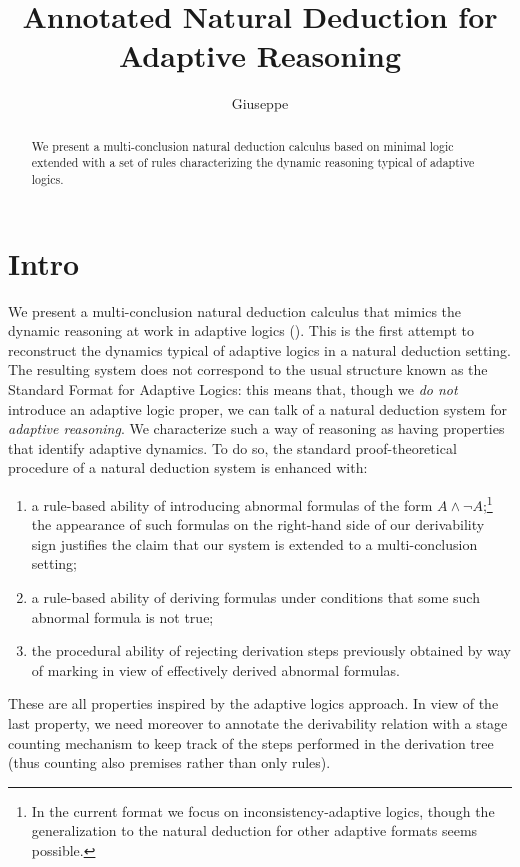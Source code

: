 \documentclass[]{article}
\title{Annotated Natural Deduction for Adaptive Reasoning}
\author{Giuseppe	}
\begin{document}
\maketitle

\begin{abstract}
We present a multi-conclusion natural deduction calculus based on minimal logic extended with a set of rules characterizing the dynamic reasoning typical of adaptive logics.
\end{abstract}

\section{Intro}

We present a multi-conclusion natural deduction calculus that mimics the dynamic reasoning at work in adaptive logics (\cite{batens07}). This is the first attempt to reconstruct the dynamics typical of adaptive logics in a natural deduction setting. The resulting system does not correspond to the usual structure known as the Standard Format for Adaptive Logics: this means that, though we \textit{do not} introduce an adaptive logic proper, we can talk of a natural deduction system for \textit{adaptive reasoning}. We characterize such a way of reasoning as having properties that identify adaptive dynamics.  To do so, the standard proof-theoretical procedure of a natural deduction system is enhanced with:

\begin{enumerate}
\item a rule-based ability of introducing abnormal formulas of the form $A\wedge \neg A$;\footnote{In the current format we focus on inconsistency-adaptive logics, though the generalization to the natural deduction for other adaptive formats seems possible.} the appearance of such formulas on the right-hand side of our derivability sign justifies the claim that our system is extended to a multi-conclusion setting;

\item a rule-based ability of deriving formulas under conditions that some such abnormal formula is not true;

\item the procedural ability of rejecting derivation steps previously obtained by way of marking in view of effectively derived abnormal formulas.
\end{enumerate}

These are all properties inspired by the adaptive logics approach. In view of the last property, we need moreover to annotate the derivability relation with a stage counting mechanism to keep track of the steps performed in the derivation tree (thus counting also premises rather than only rules).
\end{document}
